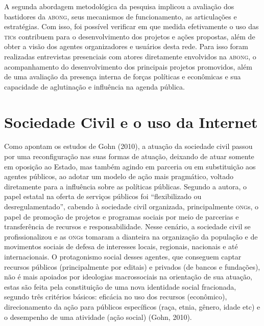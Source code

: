 A segunda abordagem metodológica da pesquisa implicou a avaliação dos
bastidores da \textsc{abong}, seus mecanismos de funcionamento, as articulações e
estratégias. Com isso, foi possível verificar em que medida efetivamente
o uso das \textsc{tic}s contribuem para o desenvolvimento dos projetos e ações
propostas, além de obter a visão dos agentes organizadores e usuários
desta rede. Para isso foram realizadas entrevistas presenciais com
atores diretamente envolvidos na \textsc{abong}, o acompanhamento do
desenvolvimento dos principais projetos promovidos, além de uma
avaliação da presença interna de forças políticas e econômicas e sua
capacidade de aglutinação e influência na agenda pública.

\section{Sociedade Civil e o uso da Internet}

Como apontam os estudos de Gohn (2010), a atuação da sociedade civil
passou por uma reconfiguração nas suas formas de atuação, deixando de
atuar somente em oposição ao Estado, mas também agindo em parceria ou em
substituição aos agentes públicos, ao adotar um modelo de ação mais
pragmático, voltado diretamente para a influência sobre as políticas
públicas. Segundo a autora, o papel estatal na oferta de serviços
públicos foi ``flexibilizado ou desregulamentado'', cabendo à sociedade
civil organizada, principalmente \textsc{ong}s, o papel de promoção de projetos e
programas sociais por meio de parcerias e transferência de recursos e
responsabilidade. Nesse cenário, a sociedade civil se profissionalizou e
as \textsc{ong}s tomaram a dianteira na organização da população e de movimentos
sociais de defesa de interesses locais, regionais, nacionais e até
internacionais. O protagonismo social desses agentes, que conseguem
captar recursos públicos (principalmente por editais) e privados (de
bancos e fundações), não é mais apoiados por ideologias macrossociais na
orientação de sua atuação, estas são feita pela constituição de uma nova
identidade social fracionada, segundo três critérios básicos: eficácia
no uso dos recursos (econômico), direcionamento da ação para públicos
específicos (raça, etnia, gênero, idade etc) e o desempenho de uma
atividade (ação social) (Gohn, 2010).

